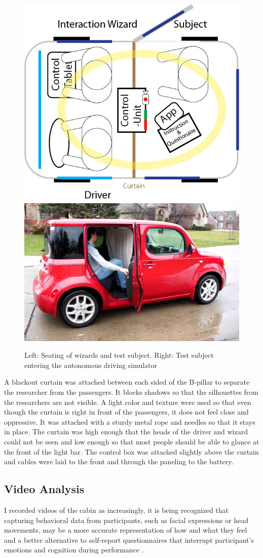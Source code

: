 \begin{figure}
    \includegraphics[height=0.38\textwidth]{fig/test-setup-hori}\hfill\includegraphics[height=0.35\textwidth]{fig/enter.png}
    \caption[Driving Simulator]{Left: Seating of wizards and test subject. Right: Test subject entering the autonomous driving simulator}
    \label{fig:testsetup}
\end{figure}

A blackout curtain was attached between each sided of the B-pillar to separate the researcher from the passengers. It blocks shadows so that the silhouettes from the researchers are not visible. A light color and texture were used so that even though the curtain is right in front of the passengers, it does not feel close and oppressive. It was attached with a sturdy metal rope and needles so that it stays in place. The curtain was high enough that the heads of the driver and wizard could not be seen and low enough so that most people should be able to glance at the front of the light bar.  The control box was attached slightly above the curtain and cables were laid to the front and through the paneling to the battery. 

\subsection{Video Analysis}
\label{sec:videoAnalysis}
I recorded videos of the cabin as increasingly, it is being recognized that capturing behavioral data from participants, such as facial expressions or head movements, may be a more accurate representation of how and what they feel and a better alternative to self-report questionnaires that interrupt participant’s emotions and cognition during performance \citep[see][]{Ahn2011UsingPrediction}.

